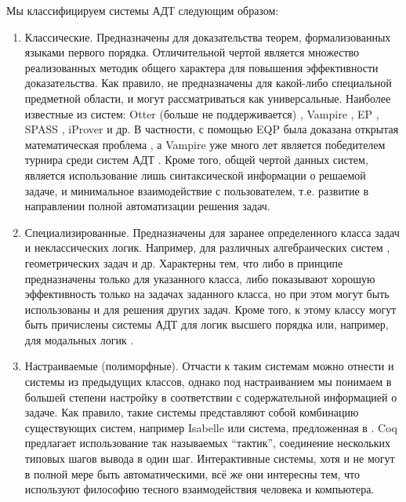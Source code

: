 Мы классифицируем системы АДТ следующим образом:
\begin{enumerate}
\item Классические. Предназначены для доказательства теорем, формализованных языками первого порядка. Отличительной чертой является множество реализованных методик общего характера для повышения эффективности доказательства. Как правило, не предназначены для какой-либо специальной предметной области, и могут рассматриваться как универсальные. Наиболее известные из систем: Otter (больше не поддерживается) \cite{otter}, Vampire \cite{vprover}, EP \cite{eprover}, SPASS \cite{SPASS}, iProver \cite{iprover} и др.  В частности,  с помощью EQP \cite{EQP} была доказана открытая математическая проблема \cite{McCuneRob}, а Vampire уже много лет является победителем турнира среди систем АДТ \cite{CASC}. Кроме того, общей чертой данных систем, является использование лишь синтаксической информации о решаемой задаче, и минимальное взаимодействие с пользователем, т.е. развитие в направлении полной автоматизации решения задач.

\item Специализированные. Предназначены для заранее определенного класса задач и неклассических логик. Например, для различных алгебраических систем \cite{tptp}, геометрических задач \cite{ATP_geometry, tptp} и др. Характерны тем, что либо в принципе предназначены только для указанного класса, либо показывают хорошую эффективность только на задачах заданного класса, но при этом могут быть использованы и для решения других задач. Кроме того, к этому классу могут быть причислены системы АДТ для логик высшего порядка \cite{HOLprover} или, например, для модальных логик \cite{ModalProver}.

\item Настраиваемые (полиморфные). Отчасти к таким системам можно отнести и системы из предыдущих классов, однако под настраиванием мы понимаем в большей степени настройку в соответствии с содержательной информацией о задаче. Как правило, такие системы представляют собой комбинацию существующих систем, например Isabelle \cite{Isabelle} или система, предложенная в \cite{ProblemOrientedATP1}. Coq \cite{LaCoq} предлагает использование так называемых ``тактик'', соединение нескольких типовых шагов вывода в один шаг. Интерактивные системы, хотя и не могут в полной мере быть автоматическими, всё же они интересны тем, что используют философию тесного взаимодействия человека и компьютера.
\end{enumerate}


